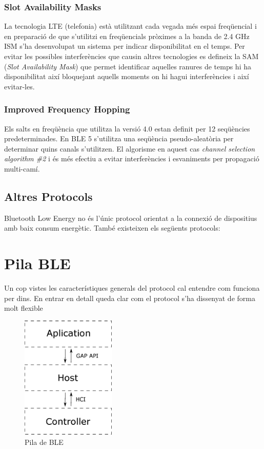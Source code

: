 \subsubsection{Slot Availability Masks}
La tecnologia LTE (telefonia) està utilitzant cada vegada més espai freqüencial i en preparació de que s'utilitzi en freqüencials pròximes a la banda de 2.4 GHz ISM s'ha desenvolupat un sistema per indicar disponibilitat en el temps.
Per evitar les possibles interferències que causin altres tecnologies es defineix la SAM (\textit{Slot Availability Mask}) que permet identificar aquelles ranures de temps hi ha disponibilitat així bloquejant aquells moments on hi hagui interferències i així evitar-les.

\subsubsection{Improved Frequency Hopping}
Els salts en freqüència que utilitza la versió 4.0 estan definit per 12 seqüències predeterminades.
En BLE 5 s'utilitza una seqüència pseudo-aleatòria per determinar quins canals s'utilitzen. El algorisme en aquest cas \textit{channel selection algorithm \#2} i és més efectiu a evitar interferències i esvaniments per propagació multi-camí.

\subsection{Altres Protocols}
Bluetooth Low Energy no és l'únic protocol orientat a la connexió de dispositius amb baix consum energètic. També existeixen els següents protocols:



\section{Pila BLE}
Un cop vistes les característiques generals del protocol cal entendre com funciona per dins.
En entrar en detall queda clar com el protocol s'ha dissenyat de forma molt flexible 

\begin{figure}[h!]
	\begin{center}
		\includegraphics[width=0.4\textwidth]{./diagrames/BLE_Stack_Simplified}
		\caption{Pila de BLE}
		\label{ble_stack}
	\end{center}
\end{figure}

